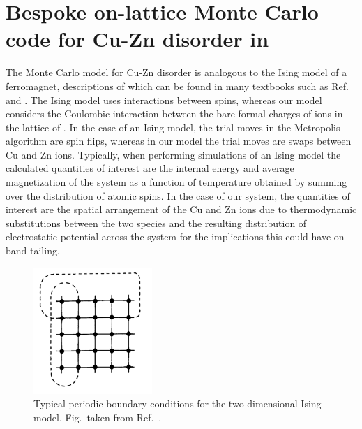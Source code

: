\documentclass[11pt, twoside]{report}
\begin{document}
\section{Bespoke on-lattice Monte Carlo code for Cu-Zn disorder in {\CZTS}}\label{Eris}
The Monte Carlo model for Cu-Zn disorder is analogous to the Ising model of a ferromagnet, descriptions of which can be found in many textbooks such as Ref.~ and . 
The Ising model uses interactions between spins, whereas our model considers the Coulombic interaction between the bare formal charges of ions in the lattice of {\CZTS}.
In the case of an Ising model, the trial moves in the Metropolis algorithm are spin flips, whereas in our model the trial moves are swaps between Cu and Zn ions. Typically, when performing simulations of an Ising model the calculated quantities of interest are the internal energy and average magnetization of the system as a function of temperature obtained by summing over the distribution of atomic spins. In the case of our system, the quantities of interest are the spatial arrangement of the Cu and Zn ions due to thermodynamic substitutions between the two species and the resulting distribution of electrostatic potential across the system for the implications this could have on band tailing. 

\begin{figure}[h!]
  \centering
    \includegraphics[width=0.4\textwidth]{figures/MC_PBCs.png}
    \caption[Typical periodic boundary conditions for the two-dimensional Ising model.]{Typical periodic boundary conditions for the two-dimensional Ising model. Fig.~taken from Ref.~.}
  \label{MC_PBCs}
\end{figure}
\end{document}
